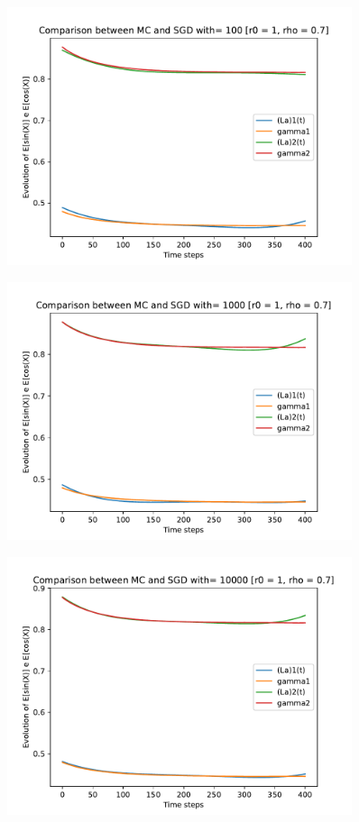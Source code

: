 \documentclass[a4paper,11pt,openright]{report}
\begin{document}
\begin{figure}[H]
\centering
\includegraphics[width=0.9\textwidth]{images/graphics T = 4/n = 4, M = 100 sine and cosine.pdf}
\end{figure}
\begin{figure}[H]
\centering
\includegraphics[width=0.9\textwidth]{images/graphics T = 4/n = 4, M = 1000 sine and cosine.pdf}
\end{figure}
\begin{figure}[H]
\centering
\includegraphics[width=0.9\textwidth]{images/graphics T = 4/n = 4, M = 10000 sine and cosine.pdf}
\end{figure}
\newpage
\end{document}
